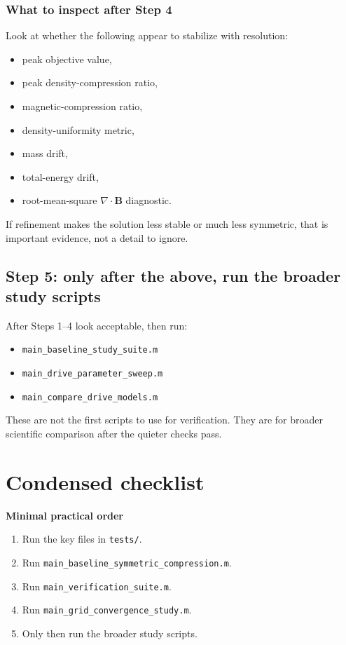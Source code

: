 \documentclass[11pt]{article}
\begin{document}
\subsubsection{What to inspect after Step 4}
Look at whether the following appear to stabilize with resolution:
\begin{itemize}[leftmargin=1.8em]
    \item peak objective value,
    \item peak density-compression ratio,
    \item magnetic-compression ratio,
    \item density-uniformity metric,
    \item mass drift,
    \item total-energy drift,
    \item root-mean-square $\nabla\!\cdot\!\mathbf{B}$ diagnostic.
\end{itemize}
If refinement makes the solution less stable or much less symmetric, that is important evidence, not a detail to ignore.

\subsection{Step 5: only after the above, run the broader study scripts}
After Steps 1--4 look acceptable, then run:
\begin{itemize}[leftmargin=1.8em]
    \item \texttt{main\_baseline\_study\_suite.m}
    \item \texttt{main\_drive\_parameter\_sweep.m}
    \item \texttt{main\_compare\_drive\_models.m}
\end{itemize}
These are not the first scripts to use for verification. They are for broader scientific comparison after the quieter checks pass.

\section{Condensed checklist}
\begin{physicsbox}
\textbf{Minimal practical order}
\begin{enumerate}[leftmargin=1.8em]
    \item Run the key files in \texttt{tests/}.
    \item Run \texttt{main\_baseline\_symmetric\_compression.m}.
    \item Run \texttt{main\_verification\_suite.m}.
    \item Run \texttt{main\_grid\_convergence\_study.m}.
    \item Only then run the broader study scripts.
\end{enumerate}
\end{physicsbox}
\end{document}
